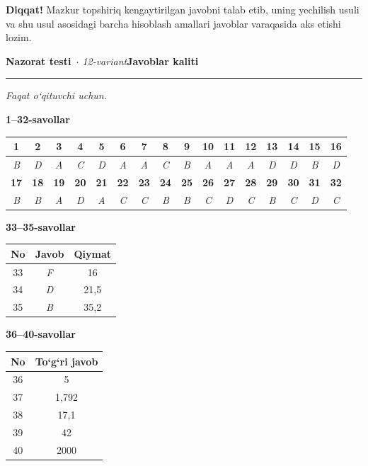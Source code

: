 \documentclass[11pt,a4paper]{article}
\newcommand{\diqqat}[1]{\par\smallskip\noindent\textbf{Diqqat!} #1\par\medskip}
\begin{document}
\diqqat{Mazkur topshiriq kengaytirilgan javobni talab etib, uning yechilish usuli va shu usul asosidagi barcha hisoblash amallari javoblar varaqasida aks etishi lozim.}
\newpage
\noindent\textbf{\fontsize{13}{15}\selectfont Nazorat testi}\ \textit{$\cdot$ 12-variant}\hfill \textbf{Javoblar kaliti}\par\smallskip\hrule\smallskip
\textit{Faqat o`qituvchi uchun.}\par\medskip
\noindent\textbf{1--32-savollar}\par\smallskip
\noindent\begin{tabular}{|c|c|c|c|c|c|c|c|c|c|c|c|c|c|c|c|}\hline
\textbf{1} & \textbf{2} & \textbf{3} & \textbf{4} & \textbf{5} & \textbf{6} & \textbf{7} & \textbf{8} & \textbf{9} & \textbf{10} & \textbf{11} & \textbf{12} & \textbf{13} & \textbf{14} & \textbf{15} & \textbf{16}\\\hline
\textsl{B} & \textsl{D} & \textsl{A} & \textsl{C} & \textsl{D} & \textsl{A} & \textsl{A} & \textsl{C} & \textsl{B} & \textsl{A} & \textsl{A} & \textsl{A} & \textsl{D} & \textsl{D} & \textsl{B} & \textsl{D}\\\hline
\textbf{17} & \textbf{18} & \textbf{19} & \textbf{20} & \textbf{21} & \textbf{22} & \textbf{23} & \textbf{24} & \textbf{25} & \textbf{26} & \textbf{27} & \textbf{28} & \textbf{29} & \textbf{30} & \textbf{31} & \textbf{32}\\\hline
\textsl{B} & \textsl{B} & \textsl{A} & \textsl{D} & \textsl{A} & \textsl{C} & \textsl{C} & \textsl{B} & \textsl{B} & \textsl{C} & \textsl{D} & \textsl{C} & \textsl{B} & \textsl{C} & \textsl{D} & \textsl{C}\\\hline
\end{tabular}\par\medskip
\noindent\textbf{33--35-savollar}\par\smallskip
\noindent\begin{tabular}{|c|c|c|}\hline \textbf{No} & \textbf{Javob} & \textbf{Qiymat}\\\hline
33 & \textsl{F} & 16\\\hline
34 & \textsl{D} & 21,5\\\hline
35 & \textsl{B} & 35,2\\\hline
\end{tabular}\par\medskip
\noindent\textbf{36--40-savollar}\par\smallskip
\noindent\begin{tabular}{|c|c|}\hline \textbf{No} & \textbf{To`g`ri javob}\\\hline
36 & 5\\\hline
37 & 1,792\\\hline
38 & 17,1\\\hline
39 & 42\\\hline
40 & 2000\\\hline
\end{tabular}\par\medskip
\end{document}
